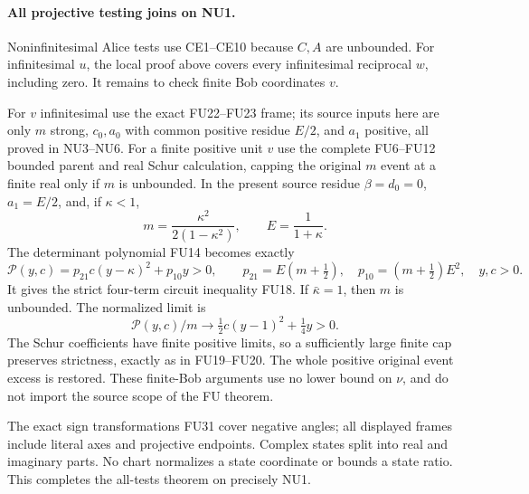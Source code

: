 \paragraph{All projective testing joins on NU1.}
Noninfinitesimal Alice tests use CE1--CE10 because $C,A$ are
unbounded. For infinitesimal $u$, the local proof above covers
every infinitesimal reciprocal $w$, including zero. It remains
to check finite Bob coordinates $v$.

For $v$ infinitesimal use the exact FU22--FU23 frame; its source
inputs here are only $m$ strong, $c_0,a_0$ with common positive
residue $E/2$, and $a_1$ positive, all proved in NU3--NU6.
For a finite positive unit $v$ use the complete FU6--FU12
bounded parent and real Schur calculation, capping the original
$m$ event at a finite real only if $m$ is unbounded. In the
present source residue $\beta=d_0=0$, $a_1=E/2$, and, if
$\kappa<1$,
\[
 m=\frac{\kappa^2}{2(1-\kappa^2)},\qquad E=\frac1{1+\kappa}.
 \tag{NU24}
\]
The determinant polynomial FU14 becomes exactly
\[
 \mathcal P(y,c)=p_{21}c(y-\kappa)^2+p_{10}y>0,
 \qquad p_{21}=E(m+\tfrac12),\quad
 p_{10}=(m+\tfrac12)E^2,\quad y,c>0.
 \tag{NU25}
\]
It gives the strict four-term circuit inequality FU18. If
$\bar\kappa=1$, then $m$ is unbounded. The normalized limit is
\[
 \mathcal P(y,c)/m\longrightarrow
              \tfrac12c(y-1)^2+\tfrac14y>0.
 \tag{NU26}
\]
The Schur coefficients have finite positive limits, so a
sufficiently large finite cap preserves strictness, exactly as
in FU19--FU20. The whole positive original event excess is
restored. These finite-Bob arguments use no lower bound on
$\nu$, and do not import the source scope of the FU theorem.

The exact sign transformations FU31 cover negative angles;
all displayed frames include literal axes and projective
endpoints. Complex states split into real and imaginary parts.
No chart normalizes a state coordinate or bounds a state ratio.
This completes the all-tests theorem on precisely NU1.
